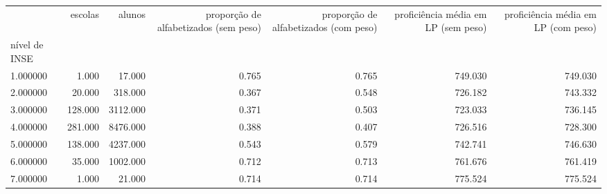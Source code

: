 \begin{tabular}{lrrrrrr}
\toprule
 & escolas & alunos & proporção de alfabetizados (sem peso) & proporção de alfabetizados (com peso) & proficiência média em LP (sem peso) & proficiência média em LP (com peso) \\
nível de INSE &  &  &  &  &  &  \\
\midrule
1.000000 & 1.000 & 17.000 & 0.765 & 0.765 & 749.030 & 749.030 \\
2.000000 & 20.000 & 318.000 & 0.367 & 0.548 & 726.182 & 743.332 \\
3.000000 & 128.000 & 3112.000 & 0.371 & 0.503 & 723.033 & 736.145 \\
4.000000 & 281.000 & 8476.000 & 0.388 & 0.407 & 726.516 & 728.300 \\
5.000000 & 138.000 & 4237.000 & 0.543 & 0.579 & 742.741 & 746.630 \\
6.000000 & 35.000 & 1002.000 & 0.712 & 0.713 & 761.676 & 761.419 \\
7.000000 & 1.000 & 21.000 & 0.714 & 0.714 & 775.524 & 775.524 \\
\bottomrule
\end{tabular}
